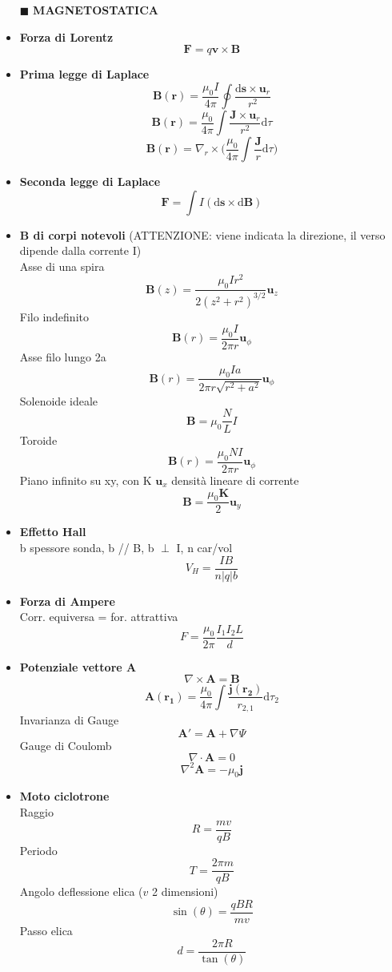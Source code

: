 \documentclass{book}
\newcommand{\g}{\textbf}
\newcommand{\h}{\mathbf}
\newcommand{\e}{\begin{equation}}
\newcommand{\ex}{\end{equation} }
\renewcommand{\it}{\item[$\cdot$]}
\begin{document}
\begin{multicols}{4}
\begin{itemize}
\hline
\item [$\blacksquare$] \g{MAGNETOSTATICA}
    \it \g{Forza di Lorentz}
        \e{\h{F}=q\h{v}\times\h{B}}\ex
    \it \g{Prima legge di Laplace}
        \e{\h{B}(\h{r})=\frac{\mu_0 I}{4\pi}\oint\frac{\mathrm{d}\h{s}\times\h{u}_r}{r^2}} \ex
        \e{\h{B}(\h{r})=\frac{\mu_0}{4\pi}\int\frac{\h{J}\times\h{u}_r}{r^2} \mathrm{d}\tau} \ex
        \e{\h{B}(\h{r})=\nabla_r\times\biggl(\frac{\mu_0}{4\pi}\int\frac{\h{J}}{r}\mathrm{d}\tau\biggr)} \ex
    \it \g{Seconda legge di Laplace}
        \e{\h{F}=\int I(\mathrm{d}\h{s}\times \mathrm{d}\h{B})} \ex
    \it \g{B di corpi notevoli} (ATTENZIONE: viene indicata la direzione, il verso dipende dalla corrente I) \\
    Asse di una spira
        \e{\h{B}(z)=\frac{\mu_0Ir^2}{2(z^2+r^2)^{3/2}}\h{u}_z} \ex
    Filo indefinito
        \e{\h{B}(r)=\frac{\mu_0I}{2\pi r}\h{u}_\phi} \ex
    Asse filo lungo 2a
        \e{\h{B}(r)=\frac{\mu_0Ia}{2\pi r \sqrt{r^2+a^2}}\h{u}_\phi} \ex
    Solenoide ideale
        \e{\h{B}=\mu_0\frac{N}{L}I}\ex
    Toroide
        \e{\h{B}(r)=\frac{\mu_0NI}{2\pi r}\h{u}_\phi} \ex
    Piano infinito su xy, con K $\h{u}_{x}$ densità lineare di corrente
        \e{\h{B}=\frac{\mu_0 \h{K}}{2}\h{u}_y} \ex
    \it \g{Effetto Hall} \\
    b spessore sonda, b // B, b $\perp$ I, n car/vol
        \e{V_H=\frac{IB}{n|q|b}} \ex
    \it \g{Forza di Ampere} \\
    Corr. equiversa = for. attrattiva 
        \e{F = \frac{\mu_0}{2\pi} \frac{I_1 I_2 L}{d}}\ex
    \it \g{Potenziale vettore A}
        \e{\nabla\times\h{A}=\h{B}}\ex
        \e{\h{A}(\h{r_1})=\frac{\mu_0}{4\pi}\int\frac{\h{j}(\h{r_2})}{r_{2,1}}\mathrm{d}\tau_2}\ex
    Invarianza di Gauge
        \e{\h{A'}=\h{A}+\nabla\Psi}\ex
    Gauge di Coulomb
        \e{\nabla\cdot \h{A}=0}\ex
        \e{\nabla^2\h{A}=-\mu_0\h{j}}\ex
    \it \g{Moto ciclotrone} \\
        Raggio
        \e{R = \frac{mv}{qB}}\ex 
        Periodo 
        \e{T = \frac{2\pi m}{qB}}\ex 
        Angolo deflessione elica ($v$ 2 dimensioni) 
        \e{\sin(\theta) = \frac{qBR}{mv}}\ex 
        Passo elica 
        \e{d=\frac{2\pi R}{\tan(\theta)}} \ex


\end{itemize}
\end{multicols}
\end{document}
